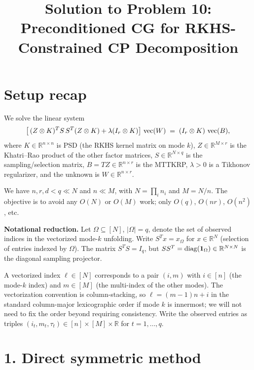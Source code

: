 
\usepackage{algorithm}
\usepackage{algpseudocode}

\title{Solution to Problem 10: Preconditioned CG for RKHS-Constrained CP Decomposition}
\date{}


\maketitle

\section*{Setup recap}

We solve the linear system
\begin{equation}\label{eq:sys}
\bigl[\,(Z\otimes K)^T S\,S^T(Z\otimes K) + \lambda(I_r\otimes K)\bigr]\,\operatorname{vec}(W) \;=\; (I_r\otimes K)\,\operatorname{vec}(B),
\end{equation}
where $K\in\mathbb R^{n\times n}$ is PSD (the RKHS kernel matrix on mode $k$), $Z\in\mathbb R^{M\times r}$ is the Khatri--Rao product of the other factor matrices, $S\in\mathbb R^{N\times q}$ is the sampling/selection matrix, $B=TZ\in\mathbb R^{n\times r}$ is the MTTKRP, $\lambda>0$ is a Tikhonov regularizer, and the unknown is $W\in\mathbb R^{n\times r}$.

We have $n,r,d<q\ll N$ and $n\ll M$, with $N=\prod_i n_i$ and $M=N/n$.  The objective is to avoid any $O(N)$ or $O(M)$ work; only $O(q)$, $O(nr)$, $O(n^2)$, etc.

\medskip
\noindent\textbf{Notational reduction.}  Let $\Omega\subseteq[N]$, $|\Omega|=q$, denote the set of observed indices in the vectorized mode-$k$ unfolding.  Write $S^T x = x_\Omega$ for $x\in\mathbb R^N$ (selection of entries indexed by $\Omega$).  The matrix $S^TS=I_q$, but $SS^T=\operatorname{diag}(\mathbf 1_\Omega)\in\mathbb R^{N\times N}$ is the diagonal sampling projector.

A vectorized index $\ell\in[N]$ corresponds to a pair $(i,m)$ with $i\in[n]$ (the mode-$k$ index) and $m\in[M]$ (the multi-index of the other modes).  The vectorization convention is column-stacking, so $\ell=(m-1)n+i$ in the standard column-major lexicographic order if mode $k$ is innermost; we will not need to fix the order beyond requiring consistency.  Write the observed entries as triples $(i_t, m_t, \tau_t)\in[n]\times[M]\times\mathbb R$ for $t=1,\ldots,q$.

\section*{1. Direct symmetric method}

